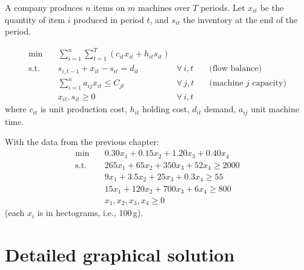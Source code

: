 \begin{example}
A company produces $n$ items on $m$ machines over $T$ periods.
Let $x_{it}$ be the quantity of item $i$ produced in period $t$, and
$s_{it}$ the inventory at the end of the period.

\[
\begin{aligned}
  \min \quad & \sum_{i=1}^{n}\sum_{t=1}^{T}
    (c_{it} x_{it} + h_{it} s_{it}) \\
  \text{s.t.} \quad
    & s_{i,t-1} + x_{it} - s_{it} = d_{it}
      & \forall\, i,t & \quad \text{(flow balance)} \\
    & \sum_{i=1}^{n} a_{ij} x_{it} \le C_{jt}
      & \forall\, j,t & \quad \text{(machine $j$ capacity)} \\
    & x_{it}, s_{it} \ge 0 & \forall\, i,t
\end{aligned}
\]
where $c_{it}$ is unit production cost, $h_{it}$ holding cost, $d_{it}$
demand, $a_{ij}$ unit machine time.
\end{example}

\begin{example}
\label{ex:diet}
With the data from the previous chapter:
\[
\begin{aligned}
  \min \quad & 0.30 x_1 + 0.15 x_2 + 1.20 x_3 + 0.40 x_4 \\
  \text{s.t.} \quad
    & 265 x_1 + 65 x_2 + 350 x_3 + 52 x_4 \ge 2000 \\
    & 9 x_1 + 3.5 x_2 + 25 x_3 + 0.3 x_4 \ge 55 \\
    & 15 x_1 + 120 x_2 + 700 x_3 + 6 x_4 \ge 800 \\
    & x_1, x_2, x_3, x_4 \ge 0
\end{aligned}
\]
(each $x_i$ is in hectograms, i.e., 100\,g).
\end{example}

\section{Detailed graphical solution}

